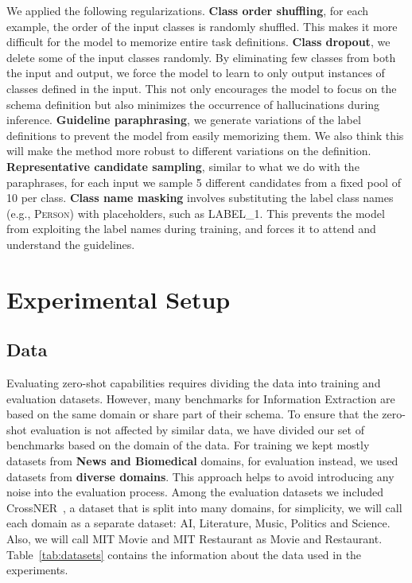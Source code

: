 \documentclass{article} \usepackage{iclr2024_conference,times}
\begin{document}
We applied the following regularizations. \textbf{Class order shuffling}, for each example, the order of the input classes is randomly shuffled. This makes it more difficult for the model to memorize entire task definitions. \textbf{Class dropout}, we delete some of the input classes randomly. By eliminating few classes from both the input and output, we force the model to learn to only output instances of classes defined in the input. This not only encourages the model to focus on the schema definition but also minimizes the occurrence of hallucinations during inference. \textbf{Guideline paraphrasing}, we generate variations of the label definitions to prevent the model from easily memorizing them. We also think this will make the method more robust to different variations on the definition. \textbf{Representative candidate sampling}, similar to what we do with the paraphrases, for each input we sample 5 different candidates from a fixed pool of 10 per class. \textbf{Class name masking} involves substituting the label class names (e.g., \textsc{Person}) with placeholders, such as \textsc{LABEL\_1}. This prevents the model from exploiting the label names during training, and forces it to attend and understand the guidelines. 


\section{Experimental Setup}

\subsection{Data}

Evaluating zero-shot capabilities requires dividing the data into training and evaluation datasets. However, many benchmarks for Information Extraction are based on the same domain or share part of their schema. To ensure that the zero-shot evaluation is not affected by similar data, we have divided our set of benchmarks based on the domain of the data. For training we kept mostly datasets from \textbf{News and Biomedical} domains, for evaluation instead, we used datasets from \textbf{diverse domains}. This approach helps to avoid introducing any noise into the evaluation process. Among the evaluation datasets we included CrossNER~\citep{liu2021crossner}, a dataset that is split into many domains, for simplicity, we will call each domain as a separate dataset: AI, Literature, Music, Politics and Science. Also, we will call MIT Movie and MIT Restaurant as Movie and Restaurant. Table~\ref{tab:datasets} contains the information about the data used in the experiments. 
\end{document}
